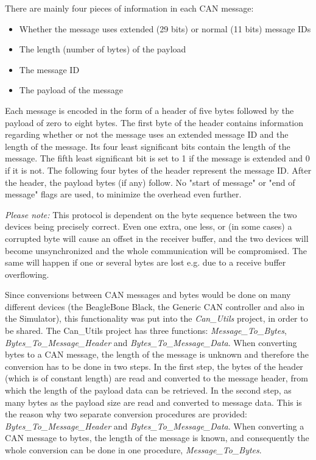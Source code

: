 There are mainly four pieces of information in each CAN message: 
\begin{itemize}
   \item { Whether the message uses extended (29 bits) or normal (11 bits) message IDs} 
   \item { The length (number of bytes) of the payload} 
   \item { The message ID}
   \item { The payload of the message}
\end{itemize}

Each message is encoded in the form of a header of five bytes followed by the payload of zero to eight bytes. The first byte of the header contains information regarding whether or not the message uses an extended message ID and the length of the message. Its four least significant bits contain the length of the message. The fifth least significant bit is set to 1 if the message is extended and 0 if it is not.  \newline
The following four bytes of the header represent the message ID. \newline
After the header, the payload bytes (if any) follow. \newline
No "start of message" or "end of message" flags are used, to minimize the overhead even further.

\emph{Please note:} This protocol is dependent on the byte sequence between the two devices being precisely correct. Even one extra, one less, or (in some cases) a corrupted byte will cause an offset in the receiver buffer, and the two devices will become unsynchronized and the whole communication will be compromised. The same will happen if one or several bytes are lost e.g. due to a receive buffer overflowing. \newline

Since conversions between CAN messages and bytes would be done on many different devices (the BeagleBone Black, the Generic CAN controller and also in the Simulator), this functionality was put into the \emph{Can\_Utils} project, in order to be shared. \newline
The Can\_Utils project has three functions: \emph{Message\_To\_Bytes}, \emph{Bytes\_To\_Message\_Header} and \emph{Bytes\_To\_Message\_Data}.  \newline
When converting bytes to a CAN message, the length of the message is unknown and therefore the conversion has to be done in two steps. 
In the first step, the bytes of the header (which is of constant length) are read and converted to the message header, from which the length of the payload data can be retrieved. In the second step, as many bytes as the payload size are read and converted to message data. \newline
This is the reason why two separate conversion procedures are provided: \emph{Bytes\_To\_Message\_Header} and \newline \emph{Bytes\_To\_Message\_Data}.  \newline
When converting a CAN message to bytes, the length of the message is known, and consequently the whole conversion can be done in one procedure, \emph{Message\_To\_Bytes}.


